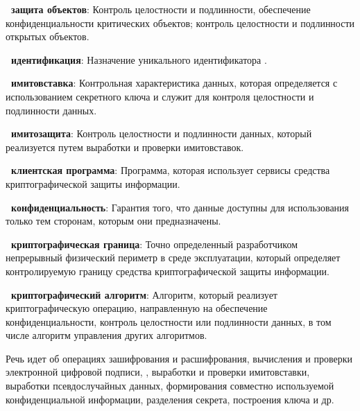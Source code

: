 {\bf \thedefctr~защита объектов}:
Контроль целостности и подлинности, обеспечение конфиденциальности критических
объектов; контроль целостности и подлинности открытых объектов.


{\bf \thedefctr~идентификация}:
Назначение уникального идентификатора
.


{\bf \thedefctr~имитовставка}:
Контрольная характеристика данных, которая определяется с использованием
секретного ключа и служит для контроля целостности и подлинности данных.

{\bf \thedefctr~имитозащита}:
Контроль целостности и подлинности данных, который реализуется путем выработки и
проверки имитовставок.

{\bf \thedefctr~клиентская программа}:
Программа, которая использует сервисы средства криптографической защиты 
информации. 


{\bf \thedefctr~конфиденциальность}:
Гарантия того, что данные доступны для использования
только тем сторонам, которым они предназначены.

{\bf \thedefctr~криптографическая граница}: 
Точно определенный разработчиком непрерывный физический периметр в среде
эксплуатации, который определяет контролируемую границу средства
криптографической защиты информации.


{\bf \thedefctr~криптографический алгоритм}:
Алгоритм, который реализует криптографическую операцию, направленную на
обеспечение конфиденциальности, контроль целостности или подлинности данных, в
том числе алгоритм управления  
других алгоритмов.

\begin{note}
Речь идет об операциях зашифрования и расшифрования, вычисления и проверки
электронной цифровой подписи, , выработки и проверки 
имитовставки, выработки псевдослучайных данных, формирования совместно 
используемой конфиденциальной информации, разделения секрета, 
построения ключа и др. 
\end{note}

